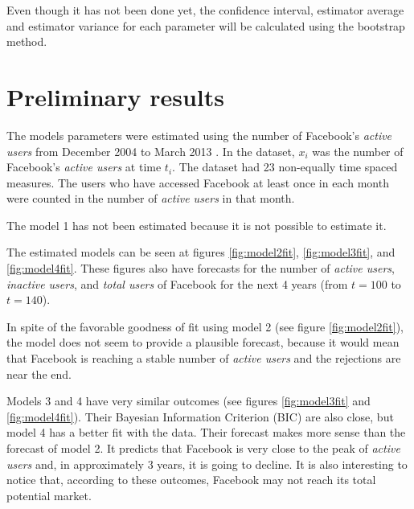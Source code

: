 Even though it has not been done yet, the confidence interval, estimator average and estimator variance for each parameter will be calculated using the bootstrap method.



\chapter{Preliminary results}

The models parameters were estimated using the number of Facebook's \textit{active users} from December 2004 to March 2013 \citep{facebookdata}. In the dataset, $x_i$ was the number of Facebook's \textit{active users} at time $t_i$. The dataset had 23 non-equally time spaced measures. The users who have accessed Facebook at least once in each month were counted in the number of \textit{active users} in that month.

The model 1 has not been estimated because it is not possible to estimate it.


The estimated models can be seen at figures \ref{fig:model2fit}, \ref{fig:model3fit}, and \ref{fig:model4fit}. These figures also have forecasts for the number of \textit{active users}, \textit{inactive users}, and \textit{total users} of Facebook for the next 4 years (from $t=100$ to $t=140$).

In spite of the favorable goodness of fit using model 2 (see figure \ref{fig:model2fit}), the model does not seem to provide a plausible forecast, because it would mean that Facebook is reaching a stable number of \textit{active users} and the rejections are near the end.

Models 3 and 4 have very similar outcomes (see figures \ref{fig:model3fit} and \ref{fig:model4fit}). Their Bayesian Information Criterion (BIC) are also close, but model 4 has a better fit with the data. Their forecast makes more sense than the forecast of model 2. It predicts that Facebook is very close to the peak of \textit{active users} and, in approximately 3 years, it is going to decline. It is also interesting to notice that, according to these outcomes, Facebook may not reach its total potential market.

